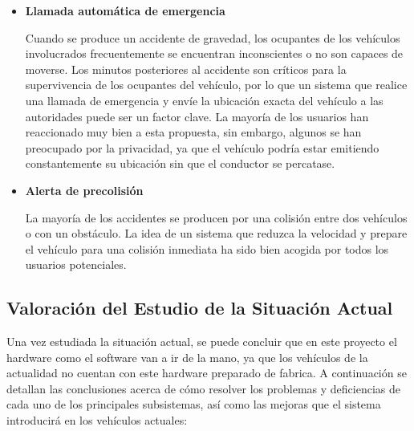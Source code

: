 \documentclass[10pt,a4paper,oldfontcommands]{dpds}
\begin{document}
\begin{itemize}[-]
\item \textbf{Llamada automática de emergencia}
\par Cuando se produce un accidente de gravedad, los ocupantes de los vehículos involucrados frecuentemente se encuentran inconscientes o no son capaces de moverse. Los minutos posteriores al accidente son críticos para la supervivencia de los ocupantes del vehículo, por lo que un sistema que realice una llamada de emergencia y envíe la ubicación exacta del vehículo a las autoridades puede ser un factor clave. La mayoría de los usuarios han reaccionado muy bien a esta propuesta, sin embargo, algunos se han preocupado por la privacidad, ya que el vehículo podría estar emitiendo constantemente su ubicación sin que el conductor se percatase.

\item \textbf{Alerta de precolisión}
\par La mayoría de los accidentes se producen por una colisión entre dos vehículos o con un obstáculo. La idea de un sistema que reduzca la velocidad y prepare el vehículo para una colisión inmediata ha sido bien acogida por todos los usuarios potenciales.


\end{itemize}

\subsection{Valoración del Estudio de la Situación Actual}
\par Una vez estudiada la situación actual, se puede concluir que en este proyecto el hardware como el software van a ir de la mano, ya que los vehículos de la actualidad no cuentan con este hardware preparado de fabrica. A continuación se detallan las conclusiones acerca de cómo resolver los problemas y deficiencias de cada uno de los principales subsistemas, así como las mejoras que el sistema introducirá en los vehículos actuales:
\end{document}
